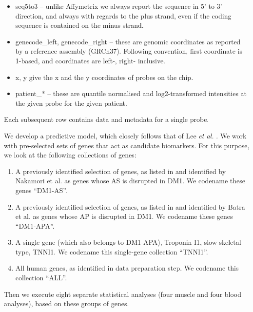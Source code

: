 \documentclass[10pt,letterpaper]{article}
\begin{document}
\begin{itemize}

\item seq5to3 – unlike Affymetrix we always report the sequence in 5' to 3' direction, and always with regards to the plus strand, even if the coding sequence is contained on the minus strand.
\item genecode\_left, genecode\_right – these are genomic coordinates as reported by a reference assembly (GRCh37). Following convention, first coordinate is 1-based, and coordinates are left-, right- inclusive.
\item x, y give the x and the y coordinates of probes on the chip.
\item patient\_* – these are quantile normalised and log2-transformed intensities at the given probe for the given patient.

\end{itemize}

Each subsequent row contains data and metadata for a single probe.

We develop a predictive model, which closely follows that of Lee {\it et al.} \cite{Lee2013}. We work with pre-selected sets of genes that act as candidate biomarkers. For this purpose, we look at the following collections of genes:

\begin{enumerate}

\item A previously identified selection of genes, as listed in  and identified by Nakamori et al. \cite{Nakamori2013} as genes whose AS is disrupted in DM1. We codename these genes ``DM1-AS''.

\item A previously identified selection of genes, as listed in  and identified by Batra et al. \cite{Batra2014} as genes whose AP is disrupted in DM1. We codename these genes ``DM1-APA''.

\item A single gene (which also belongs to DM1-APA), Troponin I1, slow skeletal type, TNNI1. We codename this single-gene collection ``TNNI1''.

\item All human genes, as identified in data preparation step. We codename this collection ``ALL''.
\end{enumerate}
Then we execute eight separate statistical analyses (four muscle and four blood analyses), based on these groups of genes.
\end{document}
